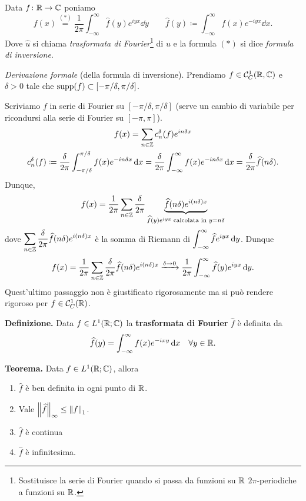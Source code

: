Data $f \colon \mathbb R \to \mathbb C$ poniamo
%
$$
	f(x) \overset{(\ast)}{=} \frac{1}{2\pi} \int_{-\infty}^\infty \hat{f}(y) e^{iyx} \dd y 
	\qquad \hat{f}(y) \coloneqq \int_{-\infty}^\infty f(x) e^{-iyx} \dd x.
$$
%
Dove $\hat{u}$ si chiama \textit{trasformata di Fourier}\footnote{Sostituisce la serie di Fourier quando si passa da funzioni su $\mathbb R$ $2\pi$-periodiche a funzioni su $\mathbb R$.} di $u$ e la formula $(\ast)$ si dice \textit{formula di inversione}.

\textit{Derivazione formale} (della formula di inversione).
Prendiamo $f \in \mathcal{C}_C^1(\mathbb R,\mathbb C)$ e $\delta > 0$ tale che $\operatorname{supp}(f) \subset [-\pi / \delta, \pi / \delta]$. 

Scriviamo $f$ in serie di Fourier su $[-\pi / \delta, \pi / \delta]$ (serve un cambio di variabile per ricondursi alla serie di Fourier su $[-\pi,\pi]$).
%
\begin{gather*}
	f(x) = \sum_{n \in \mathbb Z} c_n^\delta (f) e^{in \delta x} \\
	c_n^\delta (f) \coloneqq \frac{\delta}{2\pi} \int_{-\pi / \delta}^{\pi / \delta} f(x) e^{-in \delta x} \,\mathrm{d} x
	= \frac{\delta}{2\pi} \int_{-\infty}^\infty f(x) e^{-in \delta x} \,\mathrm{d} x
	= \frac{\delta}{2\pi} \widehat{f}(n\delta).
\end{gather*}
Dunque,
%
$$
	f(x) = \frac{1}{2\pi} \sum_{n \in \mathbb Z} \frac{\delta}{2\pi} \underbrace{\widehat{f}(n\delta) e^{i(n\delta)x}}_{\widehat{f}(y) e^{iyx} \; \text{calcolata in } y = n\delta}
$$
%
dove $\displaystyle \sum_{n \in \mathbb Z} \frac{\delta}{2\pi}\widehat{f}(n\delta) e^{i(n\delta)x} $ è la somma di Riemann di $\displaystyle \int_{-\infty}^{\infty} \widehat{f} e^{iyx} \,\mathrm{d} y$.
Dunque
%
$$
	f(x) = \frac{1}{2\pi} \sum_{n \in \mathbb Z} \frac{\delta}{2\pi} \widehat{f}(n\delta) e^{i(n\delta)x}
	\xrightarrow{\delta \to 0}
	\frac{1}{2\pi} \int_{-\infty}^{\infty} \widehat{f}(y) e^{iyx} \,\mathrm{d} y.
$$
%
Quest'ultimo passaggio non è giustificato rigorosamente ma si può rendere rigoroso per $f \in \mathcal{C}_C^1(\mathbb R)$.

\vss

\textbf{Definizione.} Data $f \in L^1(\mathbb R; \mathbb C)$ la \textbf{trasformata di Fourier} $\hat{f}$ è definita da
%
$$
	\widehat{f}(y) = \int_{-\infty}^\infty f(x) e^{-ixy} \,\mathrm{d} x \quad \forall y \in \mathbb R.
$$
%

\newpage

\textbf{Teorema.} Data $f \in L^1(\mathbb R;\mathbb C)$, allora
\begin{enumerate}

	\item $\hat{f}$ è ben definita in ogni punto di $\mathbb R$.

	\item Vale $\left\lVert \widehat{f} \right\rVert_\infty \leq \left\lVert f \right\rVert_1$.

	\item $\hat{f}$ è continua

	\item $\hat{f}$ è infinitesima.

\end{enumerate}

